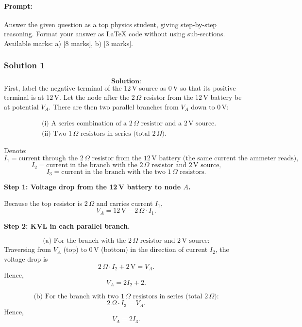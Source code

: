 \documentclass{article}
\begin{document}
\paragraph{Prompt: \\} 
Answer the given question as a top physics student, giving step-by-step reasoning. Format your answer as LaTeX code without using sub-sections. Available marks: a) [8 marks], b) [3 marks].

\subsubsection{Solution 1}
\[
\textbf{Solution:}
\]
First, label the negative terminal of the 12 V source as \(0\,\mathrm{V}\) so that its positive terminal is at \(12\,\mathrm{V}\). Let the node after the \(2\,\Omega\) resistor from the \(12\,\mathrm{V}\) battery be at potential \(V_A\). There are then two parallel branches from \(V_A\) down to \(0\,\mathrm{V}\):

\[
\begin{aligned}
&\text{(i) A series combination of a }2\,\Omega\text{ resistor and a }2\,\mathrm{V}\text{ source.}\\
&\text{(ii) Two }1\,\Omega\text{ resistors in series (total }2\,\Omega\text{).}
\end{aligned}
\]

Denote:
\[
I_1 = \text{current through the }2\,\Omega\text{ resistor from the }12\,\mathrm{V}\text{ battery (the same current the ammeter reads),}
\]
\[
I_2 = \text{current in the branch with the }2\,\Omega\text{ resistor and }2\,\mathrm{V}\text{ source,}
\]
\[
I_3 = \text{current in the branch with the two }1\,\Omega\text{ resistors.}
\]

\textbf{Step 1: Voltage drop from the 12 V battery to node \(A\).}

Because the top resistor is \(2\,\Omega\) and carries current \(I_1\),
\[
V_A = 12\,\mathrm{V} - 2\,\Omega \cdot I_1.
\]

\textbf{Step 2: KVL in each parallel branch.}

\[
\text{(a) For the branch with the }2\,\Omega\text{ resistor and }2\,\mathrm{V}\text{ source:}
\]
Traversing from \(V_A\) (top) to \(0\,\mathrm{V}\) (bottom) in the direction of current \(I_2\), the voltage drop is
\[
2\,\Omega \cdot I_2 + 2\,\mathrm{V} = V_A.
\]
Hence,
\[
V_A = 2I_2 + 2.
\]

\[
\text{(b) For the branch with two }1\,\Omega\text{ resistors in series (total }2\,\Omega\text{):}
\]
\[
2\,\Omega \cdot I_3 = V_A.
\]
Hence,
\[
V_A = 2I_3.
\]
\end{document}
